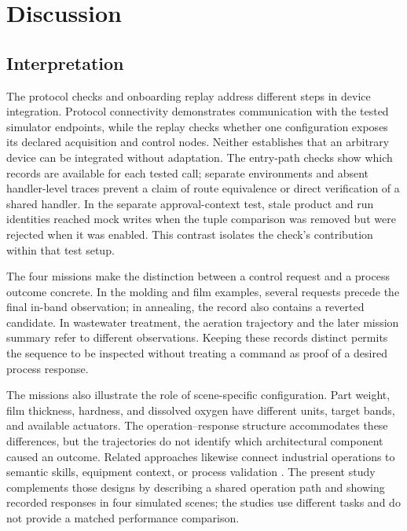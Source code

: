 \section{Discussion}
\label{sec:discussion}
\subsection{Interpretation}
The protocol checks and onboarding replay address different steps in device
integration. Protocol connectivity demonstrates communication with the tested
simulator endpoints, while the replay checks whether one configuration exposes
its declared acquisition and control nodes. Neither establishes that an
arbitrary device can be integrated without adaptation. The entry-path checks
show which records are available for each tested call; separate environments
and absent handler-level traces prevent a claim of route equivalence or direct
verification of a shared handler. In the separate approval-context test, stale product and run identities
reached mock writes when the tuple comparison was removed but were rejected
when it was enabled. This contrast isolates the check's contribution within
that test setup.

The four missions make the distinction between a control request and a
process outcome concrete. In the molding and film examples, several requests
precede the final in-band observation; in annealing, the record also contains
a reverted candidate. In wastewater treatment, the aeration trajectory and
the later mission summary refer to different observations. Keeping these
records distinct permits the sequence to be inspected without treating a
command as proof of a desired process response.

The missions also illustrate the role of scene-specific configuration.
Part weight, film thickness, hardness, and dissolved oxygen have different
units, target bands, and available actuators. The operation--response
structure accommodates these differences, but the trajectories do not
identify which architectural component caused an outcome. Related approaches
likewise connect industrial operations to semantic skills, equipment context,
or process validation \cite{koehle2025semanticrecipes,graul2026aas,schall2026safe}.
The present study complements those designs by describing a shared operation
path and showing recorded responses in four simulated scenes; the studies use
different tasks and do not provide a matched performance comparison.

